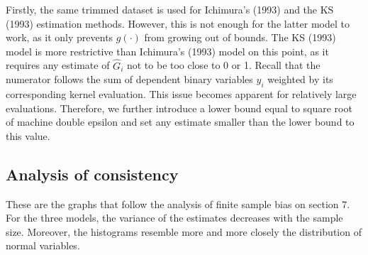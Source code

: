 Firstly, the same trimmed dataset is used for Ichimura's (1993) \cite{[6]} and the KS (1993) \cite{[12]} estimation methods. However, this is not enough for the latter model to work, as it only prevents $g(\cdot)$ from growing out of bounds.  The KS (1993) \cite{[12]} model is more restrictive than Ichimura's (1993) \cite{[6]} model on this point, as it requires any estimate of $\hat{G}_i$ not to be too close to 0 or 1. Recall that the numerator follows the sum of dependent binary variables $y_i$ weighted by its corresponding kernel evaluation. This issue becomes apparent for relatively large evaluations. Therefore, we further introduce a lower bound equal to square root of machine double epsilon and set any estimate smaller than the lower bound to this value.




\subsection{Analysis of consistency}
These are the graphs that follow the analysis of finite sample bias on section 7. For the three models, the variance of the estimates decreases with the sample size. Moreover, the histograms resemble more and more closely the distribution of normal variables.

